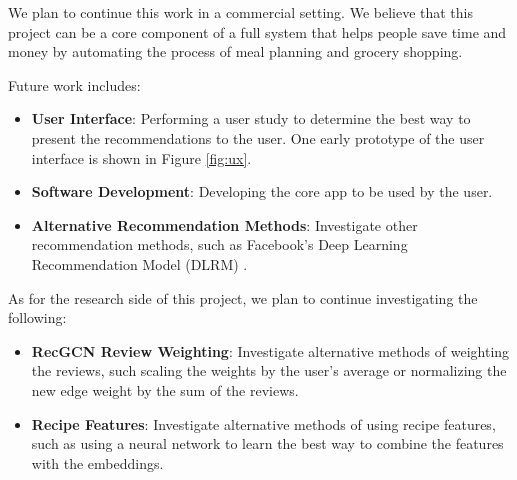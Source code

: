 \documentclass{article}
\begin{document}
We plan to continue this work in a commercial setting. We believe that this project can be a core component of a full system that helps people save time and money by automating the process of meal planning and grocery shopping.

Future work includes:
\begin{itemize}
  \item \textbf{User Interface}: Performing a user study to determine the best way to present the recommendations to the user. One early prototype of the user interface is shown in Figure \ref{fig:ux}.
  \item \textbf{Software Development}: Developing the core app to be used by the user.
  \item \textbf{Alternative Recommendation Methods}: Investigate other recommendation methods, such as Facebook's Deep Learning Recommendation Model (DLRM) \citep{dlrm}.
\end{itemize}

As for the research side of this project, we plan to continue investigating the following:

\begin{itemize}
  \item \textbf{RecGCN Review Weighting}: Investigate alternative methods of weighting the reviews, such scaling the weights by the user's average or normalizing the new edge weight by the sum of the reviews.
  \item \textbf{Recipe Features}: Investigate alternative methods of using recipe features, such as using a neural network to learn the best way to combine the features with the embeddings.
\end{itemize}






\end{document}
